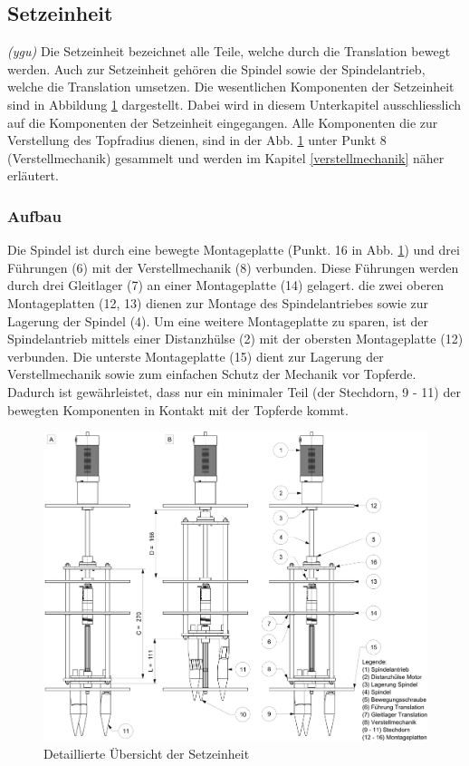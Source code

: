 \subsection{Setzeinheit} \label{sec:Setzeinheit}
\textit{(ygu)} Die Setzeinheit bezeichnet alle Teile, welche durch die Translation bewegt werden. Auch zur Setzeinheit gehören die Spindel sowie der Spindelantrieb, welche die Translation umsetzen.
\newline
Die wesentlichen Komponenten der Setzeinheit sind in Abbildung \ref{fig:setzeinheit} dargestellt. Dabei wird in diesem Unterkapitel ausschliesslich auf die Komponenten der Setzeinheit eingegangen. Alle Komponenten die zur Verstellung des Topfradius dienen, sind in der Abb.  \ref{fig:setzeinheit} unter Punkt 8 (Verstellmechanik) gesammelt und werden im Kapitel \ref{verstellmechanik} näher erläutert.
\subsubsection{Aufbau}
Die Spindel ist durch eine bewegte Montageplatte (Punkt. 16 in Abb. \ref{fig:setzeinheit}) und drei Führungen (6) mit der Verstellmechanik (8) verbunden. Diese Führungen werden durch drei Gleitlager (7)  an einer Montageplatte (14) gelagert. die zwei oberen Montageplatten (12, 13) dienen zur Montage des Spindelantriebes sowie zur Lagerung der Spindel (4). Um eine weitere Montageplatte zu sparen, ist der Spindelantrieb mittels einer Distanzhülse (2) mit der obersten Montageplatte (12) verbunden. Die unterste Montageplatte (15) dient zur Lagerung der Verstellmechanik sowie zum einfachen Schutz der Mechanik vor Topferde. Dadurch ist gewährleistet, dass nur ein minimaler Teil (der Stechdorn, 9 - 11) der bewegten Komponenten in Kontakt mit der Topferde kommt.
	\begin{figure}[H]
	\includegraphics[scale=0.53]{Illustrationen/6-Umsetzung/setzeinheit_aio.jpg}
	\caption{Detaillierte Übersicht der Setzeinheit}
	\label{fig:setzeinheit}
\end{figure}

